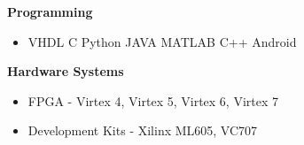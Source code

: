 \textbf{Programming}
\begin{itemize}
\item VHDL \inlineitem C \inlineitem Python \inlineitem JAVA \inlineitem MATLAB \inlineitem C++ \inlineitem Android
\end{itemize}
\textbf{Hardware Systems}
\begin{itemize}
\item FPGA - Virtex 4, Virtex 5, Virtex 6, Virtex 7
\item Development Kits - Xilinx ML605, VC707
\end{itemize}